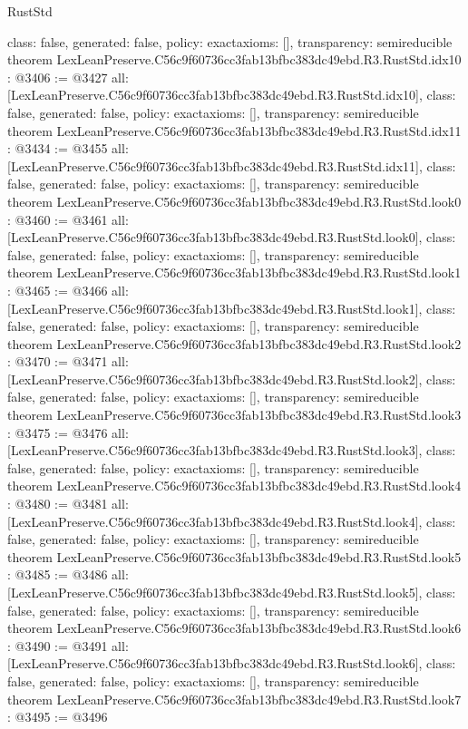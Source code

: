 \begin{lexlean}{RustStd}
\begin{coremodule}
{  class: false,
  generated: false,
  policy: exact{axioms: []},
  transparency: semireducible
}
theorem LexLeanPreserve.C56c9f60736cc3fab13bfbc383dc49ebd.R3.RustStd.idx10 : @3406 := @3427 {
  all: [LexLeanPreserve.C56c9f60736cc3fab13bfbc383dc49ebd.R3.RustStd.idx10],
  class: false,
  generated: false,
  policy: exact{axioms: []},
  transparency: semireducible
}
theorem LexLeanPreserve.C56c9f60736cc3fab13bfbc383dc49ebd.R3.RustStd.idx11 : @3434 := @3455 {
  all: [LexLeanPreserve.C56c9f60736cc3fab13bfbc383dc49ebd.R3.RustStd.idx11],
  class: false,
  generated: false,
  policy: exact{axioms: []},
  transparency: semireducible
}
theorem LexLeanPreserve.C56c9f60736cc3fab13bfbc383dc49ebd.R3.RustStd.look0 : @3460 := @3461 {
  all: [LexLeanPreserve.C56c9f60736cc3fab13bfbc383dc49ebd.R3.RustStd.look0],
  class: false,
  generated: false,
  policy: exact{axioms: []},
  transparency: semireducible
}
theorem LexLeanPreserve.C56c9f60736cc3fab13bfbc383dc49ebd.R3.RustStd.look1 : @3465 := @3466 {
  all: [LexLeanPreserve.C56c9f60736cc3fab13bfbc383dc49ebd.R3.RustStd.look1],
  class: false,
  generated: false,
  policy: exact{axioms: []},
  transparency: semireducible
}
theorem LexLeanPreserve.C56c9f60736cc3fab13bfbc383dc49ebd.R3.RustStd.look2 : @3470 := @3471 {
  all: [LexLeanPreserve.C56c9f60736cc3fab13bfbc383dc49ebd.R3.RustStd.look2],
  class: false,
  generated: false,
  policy: exact{axioms: []},
  transparency: semireducible
}
theorem LexLeanPreserve.C56c9f60736cc3fab13bfbc383dc49ebd.R3.RustStd.look3 : @3475 := @3476 {
  all: [LexLeanPreserve.C56c9f60736cc3fab13bfbc383dc49ebd.R3.RustStd.look3],
  class: false,
  generated: false,
  policy: exact{axioms: []},
  transparency: semireducible
}
theorem LexLeanPreserve.C56c9f60736cc3fab13bfbc383dc49ebd.R3.RustStd.look4 : @3480 := @3481 {
  all: [LexLeanPreserve.C56c9f60736cc3fab13bfbc383dc49ebd.R3.RustStd.look4],
  class: false,
  generated: false,
  policy: exact{axioms: []},
  transparency: semireducible
}
theorem LexLeanPreserve.C56c9f60736cc3fab13bfbc383dc49ebd.R3.RustStd.look5 : @3485 := @3486 {
  all: [LexLeanPreserve.C56c9f60736cc3fab13bfbc383dc49ebd.R3.RustStd.look5],
  class: false,
  generated: false,
  policy: exact{axioms: []},
  transparency: semireducible
}
theorem LexLeanPreserve.C56c9f60736cc3fab13bfbc383dc49ebd.R3.RustStd.look6 : @3490 := @3491 {
  all: [LexLeanPreserve.C56c9f60736cc3fab13bfbc383dc49ebd.R3.RustStd.look6],
  class: false,
  generated: false,
  policy: exact{axioms: []},
  transparency: semireducible
}
theorem LexLeanPreserve.C56c9f60736cc3fab13bfbc383dc49ebd.R3.RustStd.look7 : @3495 := @3496 {
}
\end{coremodule}
\end{lexlean}
